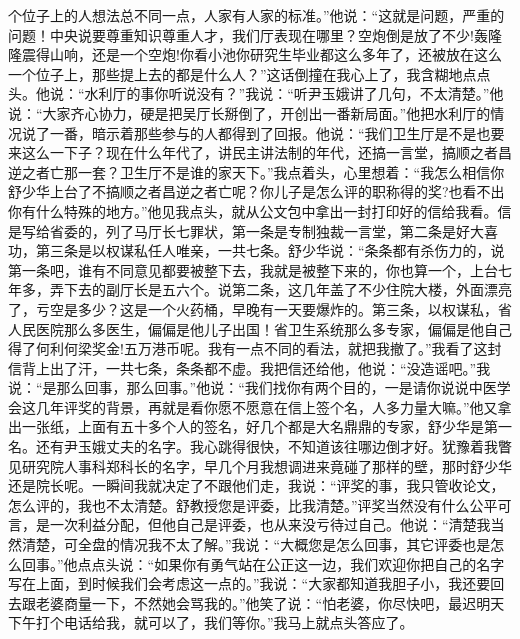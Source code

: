 \documentclass[12pt,oneside]{book}
\begin{document}
个位子上的人想法总不同一点，人家有人家的标准。''他说：``这就是问题，严重的问题！中央说要尊重知识尊重人才，我们厅表现在哪里？空炮倒是放了不少!轰隆隆震得山响，还是一个空炮!你看小池你研究生毕业都这么多年了，还被放在这么一个位子上，那些提上去的都是什么人？''这话倒撞在我心上了，我含糊地点点头。他说：``水利厅的事你听说没有？''我说：``听尹玉娥讲了几句，不太清楚。''他说：``大家齐心协力，硬是把吴厅长掰倒了，开创出一番新局面。''他把水利厅的情况说了一番，暗示着那些参与的人都得到了回报。他说：``我们卫生厅是不是也要来这么一下子？现在什么年代了，讲民主讲法制的年代，还搞一言堂，搞顺之者昌逆之者亡那一套？卫生厅不是谁的家天下。''我点着头，心里想着：``我怎么相信你舒少华上台了不搞顺之者昌逆之者亡呢？你儿子是怎么评的职称得的奖?也看不出你有什么特殊的地方。''他见我点头，就从公文包中拿出一封打印好的信给我看。信是写给省委的，列了马厅长七罪状，第一条是专制独裁一言堂，第二条是好大喜功，第三条是以权谋私任人唯亲，一共七条。舒少华说：``条条都有杀伤力的，说第一条吧，谁有不同意见都要被整下去，我就是被整下来的，你也算一个，上台七年多，弄下去的副厅长是五六个。说第二条，这几年盖了不少住院大楼，外面漂亮了，亏空是多少？这是一个火药桶，早晚有一天要爆炸的。第三条，以权谋私，省人民医院那么多医生，偏偏是他儿子出国！省卫生系统那么多专家，偏偏是他自己得了何利何梁奖金!五万港币呢。我有一点不同的看法，就把我撤了。''我看了这封信背上出了汗，一共七条，条条都不虚。我把信还给他，他说：``没造谣吧。''我说：``是那么回事，那么回事。''他说：``我们找你有两个目的，一是请你说说中医学会这几年评奖的背景，再就是看你愿不愿意在信上签个名，人多力量大嘛。''他又拿出一张纸，上面有五十多个人的签名，好几个都是大名鼎鼎的专家，舒少华是第一名。还有尹玉娥丈夫的名字。我心跳得很快，不知道该往哪边倒才好。犹豫着我瞥见研究院人事科郑科长的名字，早几个月我想调进来竟碰了那样的壁，那时舒少华还是院长呢。一瞬间我就决定了不跟他们走，我说：``评奖的事，我只管收论文，怎么评的，我也不太清楚。舒教授您是评委，比我清楚。''评奖当然没有什么公平可言，是一次利益分配，但他自己是评委，也从来没亏待过自己。他说：``清楚我当然清楚，可全盘的情况我不太了解。''我说：``大概您是怎么回事，其它评委也是怎么回事。''他点点头说：``如果你有勇气站在公正这一边，我们欢迎你把自己的名字写在上面，到时候我们会考虑这一点的。''我说：``大家都知道我胆子小，我还要回去跟老婆商量一下，不然她会骂我的。''他笑了说：``怕老婆，你尽快吧，最迟明天下午打个电话给我，就可以了，我们等你。''我马上就点头答应了。
\end{document}
